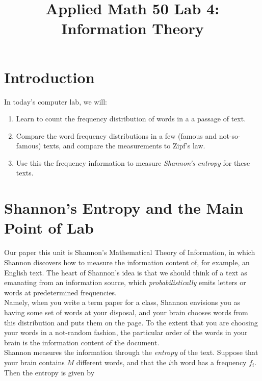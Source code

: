 \documentclass[12pt]{amsart}
\title{Applied Math 50 Lab 4: Information Theory
}
\date{}
\begin{document}
\maketitle

\section{Introduction}
In today's computer lab, we will:
\begin{enumerate}
	\item Learn to count the frequency distribution of words in a a passage of text.
	\item Compare the word frequency distributions in a few (famous and not-so-famous) texts, and compare the measurements to Zipf's law.
	\item Use this the frequency information to measure \textit{Shannon's entropy} for these texts.
\end{enumerate}

\section{Shannon's Entropy and the Main Point of Lab}

\noindent Our paper this unit is Shannon's Mathematical Theory of Information, in which Shannon discovers how to measure the information content of, for example, an English text.  The heart of Shannon's idea is that we should think of a text as emanating from an information source, which \textit{probabilistically} emits letters or words at  predetermined frequencies.\\

\noindent Namely, when you write a term paper for a class, Shannon envisions you as having some set of words at your disposal, and your brain chooses words from this distribution and puts them on the page.  To the extent that you are choosing your words in a not-random fashion, the particular order of the words in your brain is the information content of the document.\\

\noindent Shannon measures the information through the \textit{entropy} of the text.  Suppose that your brain contains $M$ different words, and that the $i$th word has a frequency $f_i$.  Then the entropy is given by
\end{document}
